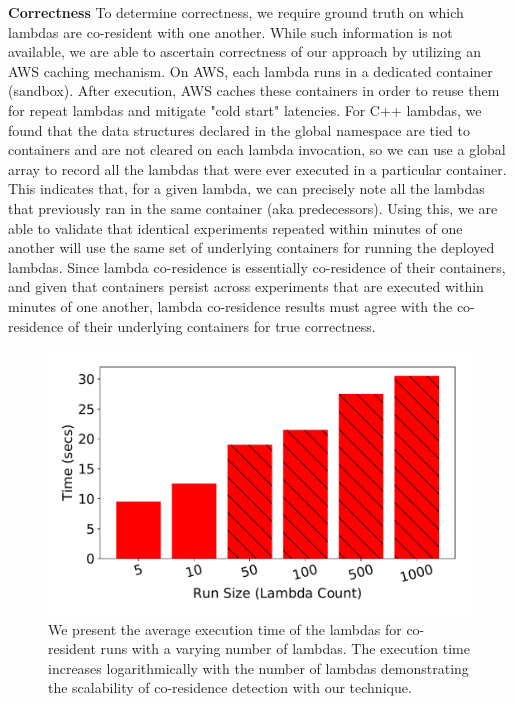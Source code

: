 \textbf{Correctness} 
To determine correctness, we require ground truth on which lambdas are
co-resident with one another. While such information is not available, we are
able to ascertain correctness of our approach by utilizing an AWS caching
mechanism. On AWS, each lambda runs in a dedicated container (sandbox).  After
execution, AWS caches these containers in order to reuse
them~\cite{awscontainerreuse} for repeat lambdas and mitigate "cold start"
latencies. For C++ lambdas, we found that the data structures declared in the
global namespace are tied to containers and are not cleared on each lambda
invocation, so we can use a global array to record all the lambdas that were
ever executed in a particular container. This indicates that, for a given
lambda, we can precisely note all the lambdas that previously ran in the same
container (aka predecessors).  Using this, we are able to validate that
identical experiments repeated within minutes of one another will use the same
set of underlying containers for running the deployed lambdas. Since lambda
co-residence is essentially co-residence of their containers, and given that
containers persist across experiments that are executed within minutes of one
another, lambda co-residence results must agree with the co-residence of their
underlying containers for true correctness.


\begin{figure}[!t]
  \includegraphics[width=.99\linewidth]{fig/runtimes.pdf}
  \caption{We present the average execution time of the lambdas for co-resident
  runs with a varying number of lambdas. The execution time increases
  logarithmically with the number of lambdas demonstrating the scalability of
  co-residence detection with our technique.
\label{fig:runtimes}}
\end{figure}


